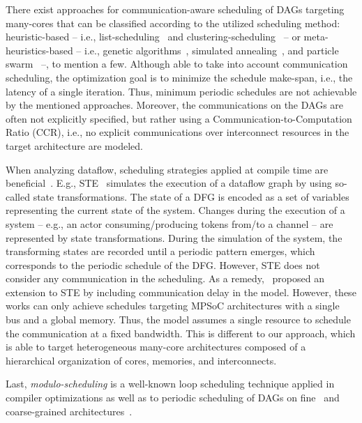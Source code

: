 There exist approaches for communication-aware scheduling of \acp{DAG} targeting many-cores that can be classified according to the utilized scheduling method: heuristic-based -- i.e., list-scheduling~\cite{Wang8301529} and clustering-scheduling~\cite{Shah9713729} -- or meta-heuristics-based -- i.e., genetic algorithms~\cite{AKBARI201735,XU2014255,computation8020026}, simulated annealing~\cite{Saad9068118}, and particle swarm~\cite{Gao9406996} --, to mention a few.
Although able to take into account communication scheduling, the optimization goal is to minimize the schedule make-span, i.e., the latency of a single iteration.
Thus, minimum periodic schedules are not achievable by the mentioned approaches.
Moreover, the communications on the \acp{DAG} are often not explicitly specified, but rather using a Communication-to-Computation Ratio (CCR), i.e., no explicit communications over interconnect resources in the target architecture are modeled.
\par
When analyzing dataflow, scheduling strategies applied at compile time are beneficial~\cite{Letras:2020}.
E.g., \ac{STE}~\cite{Stuijk:2006,Xue:2016} simulates the execution of a dataflow graph by using so-called state transformations.
The state of a \ac{DFG} is encoded as a set of variables representing the current state of the system.
Changes during the execution of a system -- e.g., an actor consuming/producing tokens from/to a channel --  are represented by state transformations.
During the simulation of the system, the transforming states are recorded until a periodic pattern emerges, which corresponds to the periodic schedule of the \ac{DFG}.
However, \ac{STE} does not consider any communication in the scheduling.
As a remedy,~\cite{Ma:2018,Ma:2021} proposed an extension to \ac{STE} by including communication delay in the model.
However, these works can only achieve schedules targeting \ac{MPSoC} architectures with a single bus and a global memory.
Thus, the model assumes a single resource to schedule the communication at a fixed bandwidth.
This is different to our approach, which is able to target heterogeneous many-core architectures composed of a hierarchical organization of cores, memories, and interconnects.
\par
Last, \emph{modulo-scheduling} is a well-known loop scheduling technique applied in compiler optimizations %
as well as to periodic scheduling of \acp{DAG} on fine~\cite{Oppermann:2016,Sittel:2022,Fiege:2023,Oppermann:2019,teich1996synthesis} and coarse-grained architectures~\cite{Ferreira:2013,Witterauf:2016,Park:2008,tirelli2023sat}.
